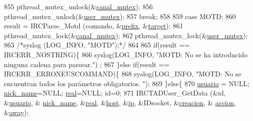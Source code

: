 \begin{DoxyCode}
{{{{{{{{{{855                         pthread\_mutex\_unlock(&\hyperlink{_g-2361-06-_p1-_server_8c_ab86a544a49de18195048bac54dd3ac3e}{canal\_mutex});
856                         pthread\_mutex\_unlock(&\hyperlink{_g-2361-06-_p1-_server_8c_a5dedd07a1144d2ab70b74a8e64b6a7c0}{user\_mutex});
857                         \textcolor{keywordflow}{break};
858 
859                 \textcolor{keywordflow}{case} MOTD:
860                         result = IRCParse\_Motd (comando, &\hyperlink{_g-2361-06-_p1-_server_8c_ad2849cf781a4db22cc1b31eaaee50a4f}{prefix}, &\hyperlink{_g-2361-06-_p1-_server_8c_a23b26cdb3a71f525caf03b57f68d47fa}{target});
861                         pthread\_mutex\_lock(&\hyperlink{_g-2361-06-_p1-_server_8c_ab86a544a49de18195048bac54dd3ac3e}{canal\_mutex});
862                         pthread\_mutex\_lock(&\hyperlink{_g-2361-06-_p1-_server_8c_a5dedd07a1144d2ab70b74a8e64b6a7c0}{user\_mutex});
863                         \textcolor{comment}{/*syslog (LOG\_INFO, "MOTD");*/}
864 
865                         \textcolor{keywordflow}{if}(result == IRCERR\_NOSTRING)\{
866                                 syslog(LOG\_INFO, \textcolor{stringliteral}{"MOTD: No se ha introducido ninguna cadena para parsear."})
      ;
867                         \}\textcolor{keywordflow}{else} \textcolor{keywordflow}{if}(result == IRCERR\_ERRONEUSCOMMAND)\{
868                                 syslog(LOG\_INFO, \textcolor{stringliteral}{"MOTD: No se encuentran todos los parámetros obligatorios.
      "});
869                         \}\textcolor{keywordflow}{else}\{
870                                 \hyperlink{_g-2361-06-_p1-_server_8c_a0147a5b81499984f9cb00379a8cb84af}{usuario} = NULL; \hyperlink{_g-2361-06-_p1-_server_8c_aabbf66718cda228b924a4a9441eadf62}{nick\_name}=NULL; 
      \hyperlink{_g-2361-06-_p1-_server_8c_af832f551e1c343666c3d2a55834139a0}{real}=NULL; \textcolor{keywordtype}{id}=0;
871                                 IRCTADUser\_GetData (&\textcolor{keywordtype}{id}, &\hyperlink{_g-2361-06-_p1-_server_8c_a0147a5b81499984f9cb00379a8cb84af}{usuario}, &
      \hyperlink{_g-2361-06-_p1-_server_8c_aabbf66718cda228b924a4a9441eadf62}{nick\_name}, &\hyperlink{_g-2361-06-_p1-_server_8c_af832f551e1c343666c3d2a55834139a0}{real}, &\hyperlink{_g-2361-06-_p1-_server_8c_a1c2046dcb30a629d6d9f45ff8f403f12}{host}, &\hyperlink{_g-2361-06-_p1-_server_8c_afbc356cd0e25d1dbbece7c10fd025fa6}{ip}, &IDsocket, &\hyperlink{_g-2361-06-_p1-_server_8c_a26292066ca0d17922eadee4161542ab9}{creacion}, &
      \hyperlink{_g-2361-06-_p1-_server_8c_a93e785c991445d8b8ee99c2e51242d5a}{accion}, &\hyperlink{_g-2361-06-_p1-_server_8c_adf86742e21384f58f8999d8317e6a370}{away});
}}}}}}}}}}
\end{DoxyCode}
